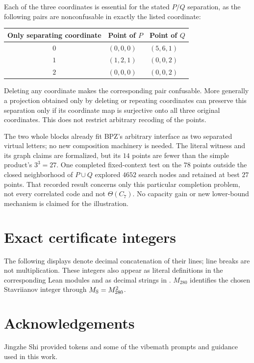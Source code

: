 \documentclass[11pt,a4paper]{article}
\theoremstyle{definition}
\theoremstyle{remark}
\newcommand{\code}[1]{\texttt{\detokenize{#1}}}
\begin{document}
Each of the three coordinates is essential for the stated $P/Q$
separation, as the following pairs are nonconfusable in exactly the
listed coordinate:
\begin{center}
\begin{tabular}{@{}cll@{}}\toprule
Only separating coordinate & Point of $P$ & Point of $Q$\\\midrule
$0$ & $(0,0,0)$ & $(5,6,1)$\\
$1$ & $(1,2,1)$ & $(0,0,2)$\\
$2$ & $(0,0,0)$ & $(0,0,2)$\\\bottomrule
\end{tabular}
\end{center}
Deleting any coordinate makes the corresponding pair confusable.
More generally a projection obtained only by deleting or repeating
coordinates can preserve this separation only if its coordinate map
is surjective onto all three original coordinates. This does not
restrict arbitrary recoding of the points.

The two whole blocks already fit BPZ's arbitrary \code{Realisation}
interface as two separated virtual letters; no new composition
machinery is needed. The literal witness and its graph claims are
formalized, but its $14$ points are fewer than the simple product's
$3^3=27$. One completed fixed-context test on the $78$ points outside
the closed neighborhood of $P\cup Q$ explored $4652$ search nodes
and retained at best $27$ points. That recorded result concerns only
this particular completion problem, not every correlated code and
not $\Theta(C_7)$. No capacity gain or new lower-bound mechanism is
claimed for the illustration.

\section{Exact certificate integers}\label{app:integers}
The following displays denote decimal concatenation of their lines;
line breaks are not multiplication. These integers also appear as
literal definitions in the corresponding Lean modules and as decimal
strings in \code{data/exact_roots.json}. $M_{280}$ identifies the
chosen Stavriianov integer through $M_{\rm S}=M_{280}^2$.


\section*{Acknowledgements}
Jingzhe Shi provided tokens and some of the vibemath prompts and
guidance used in this work.
\end{document}

